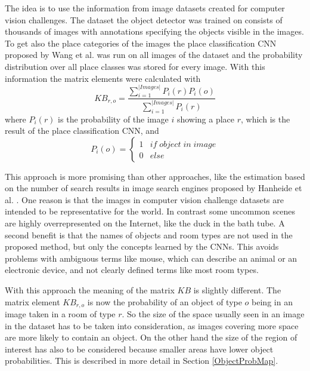 The idea is to use the information from image datasets created for computer vision challenges. The dataset the object detector was trained on consists of thousands of images with annotations specifying the objects visible in the images. To get also the place categories of the images the place classification CNN proposed by Wang et al. \cite{PlaceCNN} was run on all images of the dataset and the probability distribution over all place classes was stored for every image. With this information the matrix elements were calculated with
\begin{equation} \label{eq5_1}
    KB_{r,o}=\frac{\sum_{i=1}^{|Images|}P_i(r)P_i(o)}{\sum_{i=1}^{|Images|}P_i(r)}
\end{equation}
where $P_i(r)$ is the probability of the image $i$ showing a place $r$, which is the result of the place classification CNN, and 
\begin{equation} \label{eq5_2}
P_i(o)=\begin{cases}1 & if\; object\; in\; image\\0 & else\end{cases}
\end{equation}

This approach is more promising than other approaches, like the estimation based on the number of search results in image search engines proposed by Hanheide et al. \cite{knowledgeFromInternet}. One reason is that the images in computer vision challenge datasets are intended to be representative for the world. In contrast some uncommon scenes are highly overrepresented on the Internet, like the duck in the bath tube. A second benefit is that the names of objects and room types are not used in the proposed method, but only the concepts learned by the CNNs. This avoids problems with ambiguous terms like mouse, which can describe an animal or an electronic device, and not clearly defined terms like most room types.

With this approach the meaning of the matrix $KB$ is slightly different. The matrix element $KB_{r,o}$ is now the probability of an object of type $o$ being in an image taken in a room of type $r$. So the size of the space usually seen in an image in the dataset has to be taken into consideration, as images covering more space are more likely to contain an object. On the other hand the size of the region of interest has also to be considered because smaller areas have lower object probabilities. This is described in more detail in Section \ref{ObjectProbMap}.
